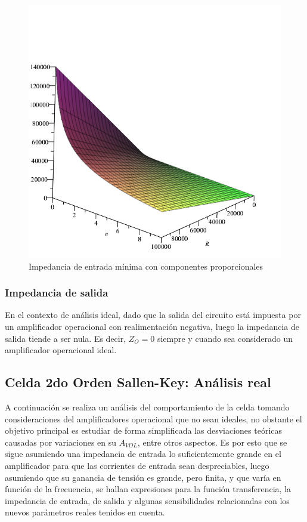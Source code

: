 \begin{figure}[H]
    \centering
    \includegraphics[scale=0.7]{../EJ1/Recursos/impedancia_entrada_componentes_proporcionales.png}
    \caption{Impedancia de entrada m\'inima con componentes proporcionales}
\end{figure}

\subsubsection{Impedancia de salida}
En el contexto de an\'alisis ideal, dado que la salida del circuito est\'a impuesta por un amplificador operacional con realimentaci\'on negativa,
luego la impedancia de salida tiende a ser nula. Es decir, $Z_O = 0$ siempre y cuando sea considerado un amplificador operacional ideal.

\subsection{Celda 2do Orden Sallen-Key: An\'alisis real}
A continuaci\'on se realiza un an\'alisis del comportamiento de la celda tomando consideraciones del amplificadores operacional que no sean ideales,
no obstante el objetivo principal es estudiar de forma simplificada las desviaciones te\'oricas causadas por variaciones en su $A_{VOL}$, entre otros aspectos.
Es por esto que se sigue asumiendo una impedancia de entrada lo suficientemente grande en el amplificador para que las corrientes de entrada sean despreciables,
luego asumiendo que su ganancia de tensi\'on es grande, pero finita, y que var\'ia en funci\'on de la frecuencia, se hallan expresiones para la funci\'on transferencia,
la impedancia de entrada, de salida y algunas sensibilidades relacionadas con los nuevos par\'ametros reales tenidos en cuenta. 

